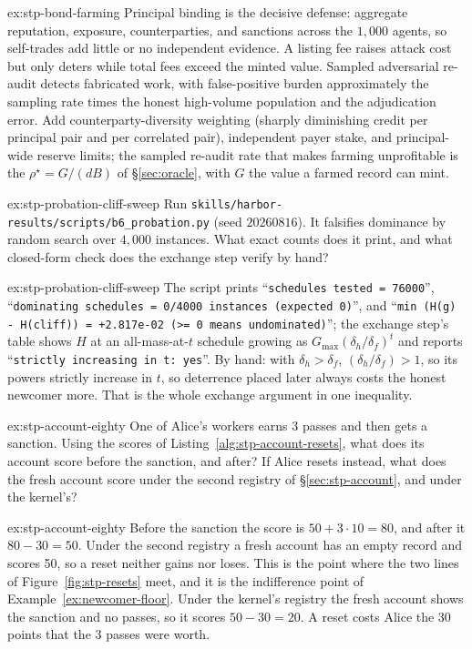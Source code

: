 \documentclass[11pt,a4paper]{article}
\theoremstyle{definition}
\begin{document}
\begin{pdsolution}{ex:stp-bond-farming}
Principal binding is the decisive defense: aggregate reputation,
exposure, counterparties, and sanctions across the $1{,}000$ agents, so
self-trades add little or no independent evidence. A listing fee raises
attack cost but only deters while total fees exceed the minted value. Sampled
adversarial re-audit detects fabricated work, with false-positive burden
approximately the sampling rate times the honest high-volume population and
the adjudication error. Add counterparty-diversity weighting (sharply diminishing
credit per principal pair and per correlated pair), independent payer stake, and
principal-wide reserve limits; the sampled re-audit rate that makes farming
unprofitable is the $\rho^\star=G/(dB)$ of \S\ref{sec:oracle}, with $G$ the
value a farmed record can mint.
\end{pdsolution}
\begin{pdexercise}[kind=Trace,rating=2]{ex:stp-probation-cliff-sweep}
Run \texttt{skills/harbor-results/scripts/b6\_probation.py} (seed $20260816$).
It falsifies dominance by random search over $4{,}000$ instances. What exact
counts does it print, and what closed-form check does the exchange step
verify by hand?
\end{pdexercise}
\begin{pdsolution}{ex:stp-probation-cliff-sweep}
The script prints ``\texttt{schedules tested = 76000}'', ``\texttt{dominating
schedules = 0/4000 instances (expected 0)}'', and
``\texttt{min (H(g) - H(cliff)) = +2.817e-02 (>= 0 means undominated)}''; the
exchange step's table shows $H$ at an all-mass-at-$t$ schedule growing as
$G_{\max}(\delta_h/\delta_f)^t$ and reports ``\texttt{strictly increasing in
t: yes}''. By hand: with $\delta_h>\delta_f$, $(\delta_h/\delta_f)>1$, so its
powers strictly increase in $t$, so deterrence placed later always costs the
honest newcomer more. That is the whole exchange argument in one inequality.
\end{pdsolution}
\begin{pdexercise}[kind=Check,rating=1]{ex:stp-account-eighty}
One of Alice's workers earns 3 passes and then gets a sanction. Using the
scores of Listing~\ref{alg:stp-account-resets}, what does its account
score before the sanction, and after? If Alice resets instead, what does
the fresh account score under the second registry of
\S\ref{sec:stp-account}, and under the kernel's?
\end{pdexercise}
\begin{pdsolution}{ex:stp-account-eighty}
Before the sanction the score is $50+3\cdot 10=80$, and after it
$80-30=50$. Under the second registry a fresh account has an empty record
and scores 50, so a reset neither gains nor loses. This is the point
where the two lines of Figure~\ref{fig:stp-resets} meet, and it is the
indifference point of Example~\ref{ex:newcomer-floor}. Under the kernel's
registry the fresh account shows the sanction and no passes, so it scores
$50-30=20$. A reset costs Alice the 30 points that the 3 passes were
worth.
\end{pdsolution}
\end{document}
